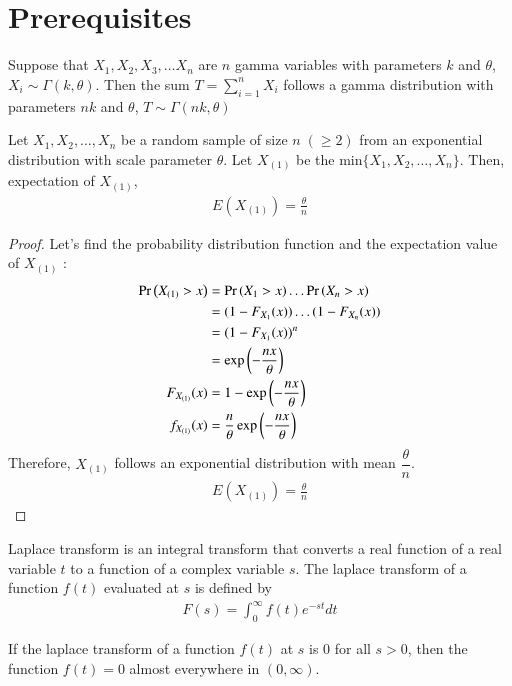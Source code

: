 \documentclass[journal,12pt,twocolumn]{IEEEtran}
\begin{document}
\section{Prerequisites}
\begin{lemma}
Suppose that $X_1, X_2, X_3, \ldots X_n$ are $n$ gamma variables with parameters $k$ and $\theta$, $X_i \sim \Gamma(k, \theta)$. Then the sum $T = \sum_{i=1}^{n} X_i$ follows a gamma distribution with parameters $nk$ and $\theta$, $T \sim \Gamma(nk, \theta)$
\end{lemma}
\begin{lemma}[Expectation of $X_{(1)}$]
\label{lemma_2.2}
Let $X_1, X_2, \ldots , X_n$ be a random sample of size $n \; ( \geq 2 ) $ from an exponential distribution with scale parameter $\theta$. Let $X_{(1)}$ be the min$ \{ X_1, X_2, \ldots , X_n \} $. Then, expectation of $X_{(1)}$, 
\begin{align}
E(X_{(1)}) = \frac{\theta}{n}
\end{align}
\begin{proof}
Let's find the probability distribution function and the expectation value of $X_{(1)}$ : 
\begin{align}
\Pr\left(X_{(1)} > x\right) &= \Pr\left(X_1 > x\right)\ldots \Pr\left(X_n > x\right)\\
&= (1-F_{X_{1}}(x))\ldots(1-F_{X_{n}}(x))\\
&= (1-F_{X_{1}}(x))^n \\
&= \exp\left(-\frac{nx}{\theta}\right)\\
F_{X_{(1)}}(x) &= 1 - \exp\left(-\frac{nx}{\theta}\right)\\
f_{X_{(1)}}(x) &= \frac{n}{\theta} \exp\left(-\frac{nx}{\theta}\right)
\end{align}
Therefore, $X_{(1)}$ follows an exponential distribution with mean $\dfrac{\theta}{n}$.
\begin{align}
E(X_{(1)}) = \frac{\theta}{n}
\end{align}
\end{proof}
\end{lemma}
\begin{definition}
Laplace transform is an integral transform that converts a real function of a real variable $t$ to a function of a complex variable $s$. The laplace transform of a function $f(t)$ evaluated at $s$ is defined by
\begin{align}
F(s) = \int_0^{\infty} f(t) e^{-st} dt
\end{align}
\end{definition}
\begin{lemma}
\label{lemma_laplace_transform}
If the laplace transform of a function $f(t)$ at $s$ is $0$ for all $s>0$, then the function $f(t) = 0$ almost everywhere in $(0, \infty)$.
\end{lemma}
\end{document}
